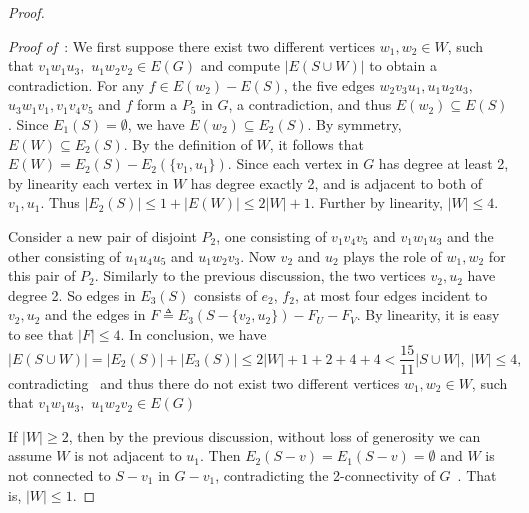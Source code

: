 \documentclass[a4paper]{article}
\begin{document}
\begin{proof}
\begin{figure}[h]
\end{figure}

\textit{Proof of~}: We first suppose there exist two different vertices $w_1,w_2\in W$, such that $v_1w_1u_3,$ $u_1w_2v_2\in E(G)$ and compute $|E(S\cup W)|$ to obtain a contradiction.
For any $f\in E(w_2)- E(S)$, the five edges $w_2v_3u_1,u_1u_2u_3,$ $u_3w_1v_1,v_1v_4v_5$ and $f$ form a $P_5$ in $G$, a contradiction, and thus $E(w_2)\subseteq E(S)$.
Since $E_1(S)=\emptyset$, we have $E(w_2)\subseteq E_2(S)$. By symmetry, $E(W)\subseteq E_2(S)$. By the definition of $W$, it follows that $E(W)=E_2(S)-E_2(\{v_1,u_1\})$. Since each vertex in $G$ has degree at least 2, by linearity each vertex in $W$ has degree exactly 2, and is adjacent to both of $v_1,u_1$.
Thus $|E_2(S)|\leq 1+|E(W)|\leq 2|W|+1$. Further by linearity, $|W|\le 4$.

Consider a new pair of disjoint $P_2$, one consisting of $v_1v_4v_5$ and $v_1w_1u_3$ and the other consisting of $u_1u_4u_5$ and $u_1w_2v_3$. Now $v_2$ and $u_2$ plays the role of $w_1,w_2$ for this pair of $P_2$. Similarly to the previous discussion, 
the two vertices $v_2,u_2$ have degree 2.
So edges in $E_3(S)$ consists of $e_2$, $f_2$, at most four edges incident to $v_2,u_2$ and the edges in $F\triangleq E_3(S-\{v_2,u_2\})-F_U-F_V$. By linearity, it is easy to see that $|F|\leq 4$. In conclusion, we have
$$|E(S\cup W)|=|E_2(S)|+|E_3(S)|\leq 2|W|+1+2+4+4< \frac{15}{11}|S\cup W|,\; |W|\le 4,$$
contradicting~ and thus there do not exist two different vertices $w_1,w_2\in W$, such that $v_1w_1u_3,$ $u_1w_2v_2\in E(G)$

If $|W|\geq 2$, then by the previous discussion, without loss of generosity we can assume $W$ is not adjacent to $u_1$.
Then $E_2(S-v)=E_1(S-v)=\emptyset$ and $W$ is not connected to $S-v_1$ in $G-v_1$, contradicting the 2-connectivity of $G$~. That is, $|W|\leq 1$.
\hfill\qedsymbol


\end{proof}
\end{document}
